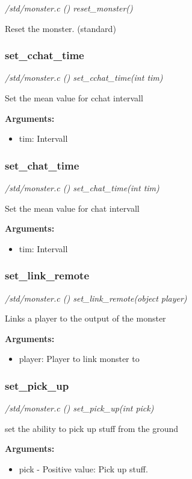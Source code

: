 {\em /std/monster.c () reset\_monster()}

Reset the monster. (standard)


\subsubsection{set\_cchat\_time}

{\em /std/monster.c () set\_cchat\_time(int tim)}

Set the mean value for cchat intervall

{\bf Arguments:}
\begin{itemize}
\item     tim: Intervall
\end{itemize}


\subsubsection{set\_chat\_time}

{\em /std/monster.c () set\_chat\_time(int tim)}

Set the mean value for chat intervall

{\bf Arguments:}
\begin{itemize}
\item     tim: Intervall
\end{itemize}


\subsubsection{set\_link\_remote}

{\em /std/monster.c () set\_link\_remote(object player)}

Links a player to the output of the monster

{\bf Arguments:}
\begin{itemize}
\item     player: Player to link monster to
\end{itemize}


\subsubsection{set\_pick\_up}

{\em /std/monster.c () set\_pick\_up(int pick)}

set the ability to pick up stuff from the ground

{\bf Arguments:}
\begin{itemize}
\item     pick - Positive value: Pick up stuff.
\end{itemize}


